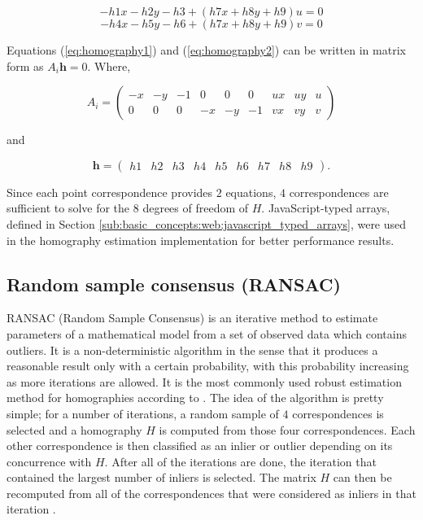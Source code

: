 \begin{equation}
\label{eq:homography1}
-h1x-h2y-h3 +(h7x+h8y+h9)u=0
\end{equation}
\begin{equation}
\label{eq:homography2}
-h4x-h5y-h6 +(h7x+h8y+h9)v=0
\end{equation}

Equations (\ref{eq:homography1}) and (\ref{eq:homography2}) can be written in matrix form as $A_i\textbf{h}=0$. Where,

$$A_i=\begin{pmatrix}-x & -y & -1 & 0 & 0 & 0 & ux & uy & u\\0 & 0 & 0 & -x & -y & -1 & vx & vy & v\end{pmatrix}$$

and

$$\textbf{h}=\begin{pmatrix}h1 & h2 & h3 & h4 & h5 & h6 & h7 & h8 & h9\end{pmatrix}.$$

Since each point correspondence provides $2$ equations, $4$ correspondences are sufficient to solve for the $8$ degrees of freedom of $H$. JavaScript-typed arrays, defined in Section \ref{sub:basic_concepts:web:javascript_typed_arrays}, were used in the homography estimation implementation for better performance results.


\subsection{Random sample consensus (RANSAC)} %
\label{sub:tracking_library_for_the_web:marker_less_tracking_algorithm:ransac}

RANSAC (Random Sample Consensus) \cite{Hartley2004} is an iterative method to estimate parameters of a mathematical model from a set of observed data which contains outliers. It is a non-deterministic algorithm in the sense that it produces a reasonable result only with a certain probability, with this probability increasing as more iterations are allowed. It is the most commonly used robust estimation method for homographies according to \cite{Homography2009}. The idea of the algorithm is pretty simple; for a number of iterations, a random sample of $4$ correspondences is selected and a homography $H$ is computed from those four correspondences. Each other correspondence is then classified as an inlier or outlier depending on its concurrence with $H$. After all of the iterations are done, the iteration that contained the largest number of inliers is selected. The matrix $H$ can then be recomputed from all of the correspondences that were considered as inliers in that iteration \cite{Homography2009}.

